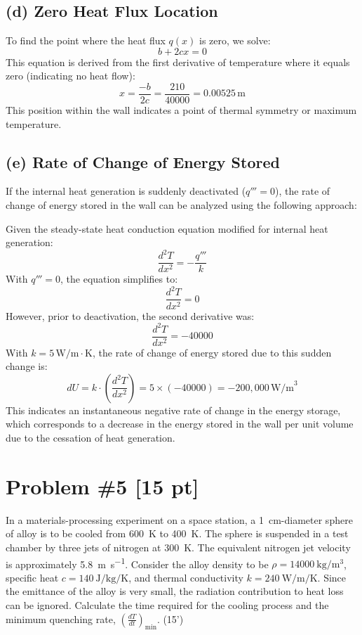 \documentclass{article}
\begin{document}
\subsection*{(d) Zero Heat Flux Location}
To find the point where the heat flux \(q(x)\) is zero, we solve:
\[ b + 2cx = 0 \]
This equation is derived from the first derivative of temperature where it equals zero (indicating no heat flow):
\[ x = \frac{-b}{2c} = \frac{210}{40000} = 0.00525 \, \text{m} \]
This position within the wall indicates a point of thermal symmetry or maximum temperature.

\subsection*{(e) Rate of Change of Energy Stored}
If the internal heat generation is suddenly deactivated (\(q''' = 0\)), the rate of change of energy stored in the wall can be analyzed using the following approach:

Given the steady-state heat conduction equation modified for internal heat generation:
\[ \frac{d^2T}{dx^2} = -\frac{q'''}{k} \]
With \(q''' = 0\), the equation simplifies to:
\[ \frac{d^2T}{dx^2} = 0 \]
However, prior to deactivation, the second derivative was:
\[ \frac{d^2T}{dx^2} = -40000 \]
With \( k = 5 \, \text{W/m}\cdot\text{K} \), the rate of change of energy stored due to this sudden change is:
\[ dU = k \cdot \left(\frac{d^2T}{dx^2}\right) = 5 \times (-40000) = -200,000 \, \text{W/m}^3 \]
This indicates an instantaneous negative rate of change in the energy storage, which corresponds to a decrease in the energy stored in the wall per unit volume due to the cessation of heat generation.



\newpage
\section{Problem \#5 [15 pt]}
In a materials-processing experiment on a space station, a \SI{1}{\centi\meter}-diameter sphere of alloy is to be cooled from \SI{600}{\kelvin} to \SI{400}{\kelvin}. The sphere is suspended in a test chamber by three jets of nitrogen at \SI{300}{\kelvin}. The equivalent nitrogen jet velocity is approximately \SI{5.8}{\meter\per\second}. Consider the alloy density to be \(\rho = \SI{14000}{\kilogram\per\meter\cubed}\), specific heat \(c = \SI{140}{\joule\per\kilogram\per\kelvin}\), and thermal conductivity \(k = \SI{240}{\watt\per\meter\per\kelvin}\). Since the emittance of the alloy is very small, the radiation contribution to heat loss can be ignored. Calculate the time required for the cooling process and the minimum quenching rate, \((\frac{dT}{dt})_{\text{min}}\). (15')
\end{document}
